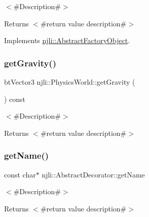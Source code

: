 $<$\#\+Description\#$>$

\begin{DoxyReturn}{Returns}
$<$\#return value description\#$>$ 
\end{DoxyReturn}


Implements \mbox{\hyperlink{classnjli_1_1_abstract_factory_object_af4151e41b80d5bc3fc42822c67fc2278}{njli\+::\+Abstract\+Factory\+Object}}.

\mbox{\label{classnjli_1_1_physics_world_a2ab946117c0c074c384956b9df0fed8b}} 
\subsubsection{\texorpdfstring{get\+Gravity()}{getGravity()}}
{\footnotesize\ttfamily bt\+Vector3 njli\+::\+Physics\+World\+::get\+Gravity (\begin{DoxyParamCaption}{ }\end{DoxyParamCaption}) const}

$<$\#\+Description\#$>$

\begin{DoxyReturn}{Returns}
$<$\#return value description\#$>$ 
\end{DoxyReturn}
\mbox{\label{classnjli_1_1_physics_world_ad41266885be835f3ee602311e20877a4}} 
\subsubsection{\texorpdfstring{get\+Name()}{getName()}}
{\footnotesize\ttfamily const char$\ast$ njli\+::\+Abstract\+Decorator\+::get\+Name}

$<$\#\+Description\#$>$

\begin{DoxyReturn}{Returns}
$<$\#return value description\#$>$ 
\end{DoxyReturn}
\mbox{\label{classnjli_1_1_physics_world_ac4ca71716ed832be357f15f8262c8448}} 
